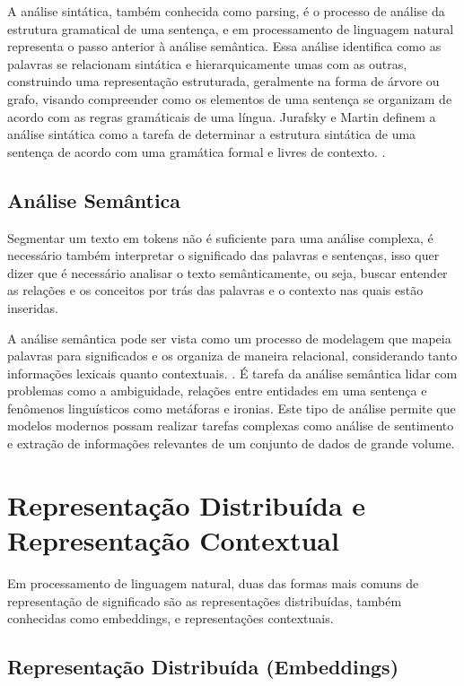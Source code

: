 A análise sintática, também conhecida como parsing, é o processo de análise da estrutura gramatical de uma sentença, e em processamento de linguagem natural representa o passo anterior à análise semântica. Essa análise identifica como as palavras se relacionam sintática e hierarquicamente umas com as outras, construindo uma representação estruturada, geralmente na forma de árvore ou grafo, visando compreender como os elementos de uma sentença se organizam de acordo com as regras gramáticais de uma língua. Jurafsky e Martin definem a análise sintática como a tarefa de determinar a estrutura sintática de uma sentença de acordo com uma gramática formal e livres de contexto. \cite{JurafskyMartin2023}.

\subsection{Análise Semântica}\label{subsec:nlp3}

Segmentar um texto em tokens não é suficiente para uma análise complexa, é necessário também interpretar o significado das palavras e sentenças, isso quer dizer que é necessário analisar o texto semânticamente, ou seja, buscar entender as relações e os conceitos por trás das palavras e o contexto nas quais estão inseridas.

A análise semântica pode ser vista como um processo de modelagem que mapeia palavras para significados e os organiza de maneira relacional, considerando tanto informações lexicais quanto contextuais. \cite{JurafskyMartin2023}. É tarefa da análise semântica lidar com problemas como a ambiguidade, relações entre entidades em uma sentença e fenômenos linguísticos como metáforas e ironias. Este tipo de análise permite que modelos modernos possam realizar tarefas complexas como análise de sentimento e extração de informações relevantes de um conjunto de dados de grande volume.

\section{Representação Distribuída e Representação Contextual}\label{subsec:embeddings_transformers}

Em processamento de linguagem natural, duas das formas mais comuns de representação de significado são as representações distribuídas, também conhecidas como embeddings, e representações contextuais. 

\subsection{Representação Distribuída (Embeddings)}\label{subsec:embeddings}

